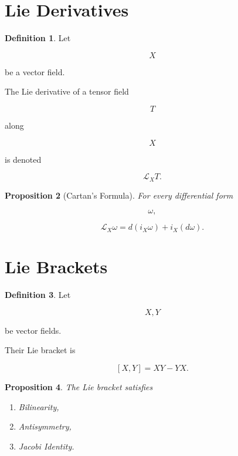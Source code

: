 \documentclass[11pt]{book}
\numberwithin{equation}{chapter}
\theoremstyle{definition}
\newtheorem{definition}{Definition}[chapter]
\theoremstyle{plain}
\newtheorem{proposition}[definition]{Proposition}
\begin{document}

\section{Lie Derivatives}

\begin{definition}

Let

\[
X
\]

be a vector field.

The Lie derivative of a tensor field

\[
T
\]

along

\[
X
\]

is denoted

\[
\mathcal L_XT.
\]

\end{definition}


\begin{proposition}[Cartan's Formula]

For every differential form

\[
\omega,
\]

\[
\mathcal L_X\omega
=
d(i_X\omega)
+
i_X(d\omega).
\]

\end{proposition}


\section{Lie Brackets}

\begin{definition}

Let

\[
X,
Y
\]

be vector fields.

Their Lie bracket is

\[
[X,Y]
=
XY
-
YX.
\]

\end{definition}


\begin{proposition}

The Lie bracket satisfies

\begin{enumerate}

\item Bilinearity,

\item Antisymmetry,

\item Jacobi Identity.

\end{enumerate}

\end{proposition}
\end{document}
